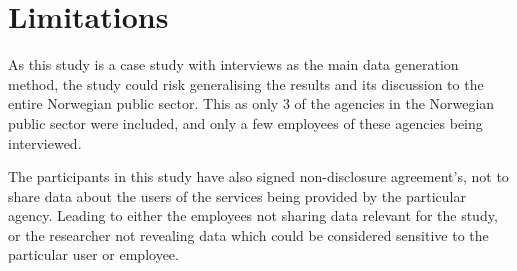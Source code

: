 



\section{Limitations}
As this study is a case study with interviews as the main data generation method, the study could risk generalising the results and its discussion to the entire Norwegian public sector. This as only 3 of the agencies in the Norwegian public sector were included, and only a few employees of these agencies being interviewed.

The participants in this study have also signed non-disclosure agreement's, not to share data about the users of the services being provided by the particular agency. Leading to either the employees not sharing data relevant for the study, or the researcher not revealing data which could be considered sensitive to the particular user or employee. 

